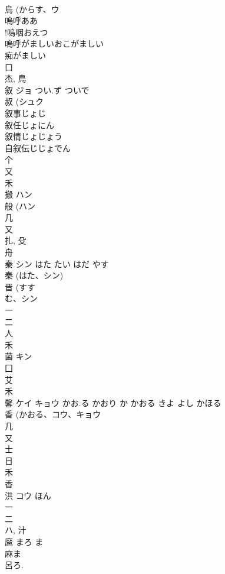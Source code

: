 \documentclass[8pt]{extreport}
\begin{document}
\begin{CJK}{UTF8}{min}
\\	烏 (からす、ウ 
\\	嗚呼ああ
\\	!嗚咽おえつ
\\	嗚呼がましいおこがましい
\\	痴がましい
\\	口 
\\	杰, 鳥 
\\	叙	ジョ	つい.ず ついで	
\\	叔 (シュク 
\\	叙事じょじ
\\	叙任じょにん
\\	叙情じょじょう
\\	自叙伝じじょでん
\\	个 
\\	又 
\\	禾 
\\	搬	ハン		
\\	般 (ハン 
\\	几 
\\	又 
\\	扎, 殳 
\\	舟 
\\	秦	シン	はた たい はだ やす	
\\	秦 (はた、シン) 
\\	晋 (すす
\\	む、シン 
\\	一 
\\	二 
\\	人 
\\	禾 
\\	菌	キン		
\\	囗 
\\	艾 
\\	禾 
\\	馨	ケイ キョウ	かお.る かおり か かおる きよ よし かほる	
\\	香 (かおる、コウ、キョウ 
\\	几 
\\	又 
\\	士 
\\	日 
\\	禾 
\\	香 
\\	洪	コウ	ほん	
\\	一 
\\	二 
\\	ハ, 汁 
\\	麿		まろ ま	
\\	麻ま 
\\	呂ろ. 

\end{CJK}
\end{document}
